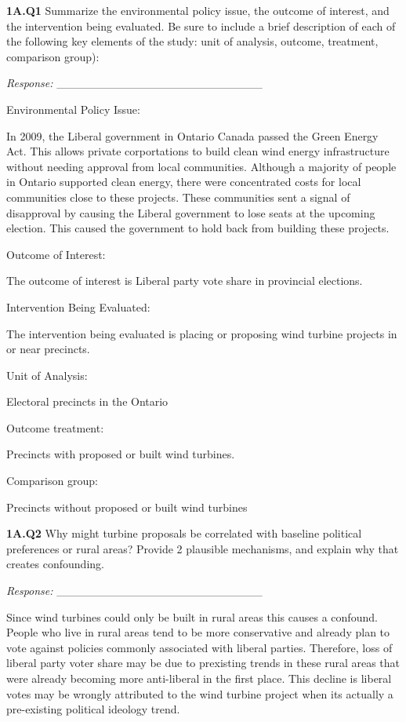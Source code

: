\documentclass[
  letterpaper,
  DIV=11,
  numbers=noendperiod]{scrartcl}
\begin{document}
\textbf{1A.Q1} Summarize the environmental policy issue, the outcome of
interest, and the intervention being evaluated. Be sure to include a
brief description of each of the following key elements of the study:
unit of analysis, outcome, treatment, comparison group):

\emph{Response:} \_\_\_\_\_\_\_\_\_\_\_\_\_\_\_\_\_\_\_\_\_\_\_\_\_

Environmental Policy Issue:

In 2009, the Liberal government in Ontario Canada passed the Green
Energy Act. This allows private corportations to build clean wind energy
infrastructure without needing approval from local communities. Although
a majority of people in Ontario supported clean energy, there were
concentrated costs for local communities close to these projects. These
communities sent a signal of disapproval by causing the Liberal
government to lose seats at the upcoming election. This caused the
government to hold back from building these projects.

Outcome of Interest:

The outcome of interest is Liberal party vote share in provincial
elections.

Intervention Being Evaluated:

The intervention being evaluated is placing or proposing wind turbine
projects in or near precincts.

Unit of Analysis:

Electoral precincts in the Ontario

Outcome treatment:

Precincts with proposed or built wind turbines.

Comparison group:

Precincts without proposed or built wind turbines

\textbf{1A.Q2} Why might turbine proposals be correlated with baseline
political preferences or rural areas? Provide 2 plausible mechanisms,
and explain why that creates confounding.

\emph{Response:} \_\_\_\_\_\_\_\_\_\_\_\_\_\_\_\_\_\_\_\_\_\_\_\_\_

Since wind turbines could only be built in rural areas this causes a
confound. People who live in rural areas tend to be more conservative
and already plan to vote against policies commonly associated with
liberal parties. Therefore, loss of liberal party voter share may be due
to prexisting trends in these rural areas that were already becoming
more anti-liberal in the first place. This decline is liberal votes may
be wrongly attributed to the wind turbine project when its actually a
pre-existing political ideology trend.
\end{document}
